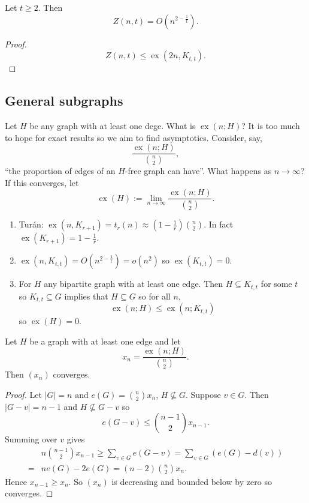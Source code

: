 \documentclass[a4paper]{article}
\DeclareMathOperator{\exx}{ex} %
\begin{document}
\begin{corollary}
  Let \(t \geq 2\). Then
  \[
    Z(n, t) = O(n^{2 - \frac{1}{t}}).
  \]
\end{corollary}

\begin{proof}
  \[
    Z(n, t) \leq \exx(2n, K_{t, t}).
  \]
\end{proof}

\subsection{General subgraphs}

Let \(H\) be any graph with at least one dege. What is \(\exx(n; H)\)? It is too much to hope for exact results so we aim to find asymptotics. Consider, say,
\[
  \frac{\exx(n; H)}{\binom{n}{2}},
\]
``the proportion of edges of an \(H\)-free graph can have''. What happens as \(n \to \infty\)? If this converges, let
\[
  \exx(H) := \lim_{n \to \infty} \frac{\exx(n; H)}{\binom{n}{2}}.
\]

\begin{eg}\leavevmode
  \begin{enumerate}
  \item Turán: \(\exx(n, K_{r + 1}) = t_r(n) \approx (1 - \frac{1}{r}) \binom{n}{2}\). In fact \(\exx(K_{r + 1}) = 1 - \frac{1}{r}\).
  \item \(\exx(n, K_{t, t}) = O(n^{2 - \frac{1}{t}}) = o(n^2)\) so \(\exx(K_{t, t}) = 0\).
  \item For \(H\) any bipartite graph with at least one edge. Then \(H \subseteq K_{t, t}\) for some \(t\) so \(K_{t, t} \subseteq G\) implies that \(H \subseteq G\) so for all \(n\),
    \[
      \exx(n; H) \leq \exx(n; K_{t, t})
    \]
    so \(\exx(H) = 0\).
  \end{enumerate}
\end{eg}

\begin{proposition}
  Let \(H\) be a graph with at least one edge and let
  \[
    x_n = \frac{\exx(n; H)}{\binom{n}{2}}.
  \]
  Then \((x_n)\) converges.
\end{proposition}

\begin{proof}
  Let \(|G| = n\) and \(e(G) = \binom{n}{2} x_n\), \(H \nsubseteq G\). Suppose \(v \in G\). Then \(|G - v| = n - 1\) and \(H \nsubseteq G - v\) so
  \[
    e(G - v) \leq \binom{n - 1}{2} x_{n - 1}.
  \]
  Summing over \(v\) gives
  \begin{align*}
    & n \binom{n - 1}{2} x_{n - 1} \geq \sum_{v \in G} e(G - v) = \sum_{v \in G} (e(G) - d(v)) \\
    =& n e(G) - 2e(G) = (n - 2) \binom{n}{2} x_n.
  \end{align*}
  Hence \(x_{n - 1} \geq x_n\). So \((x_n)\) is decreasing and bounded below by zero so converges.
\end{proof}
\end{document}
